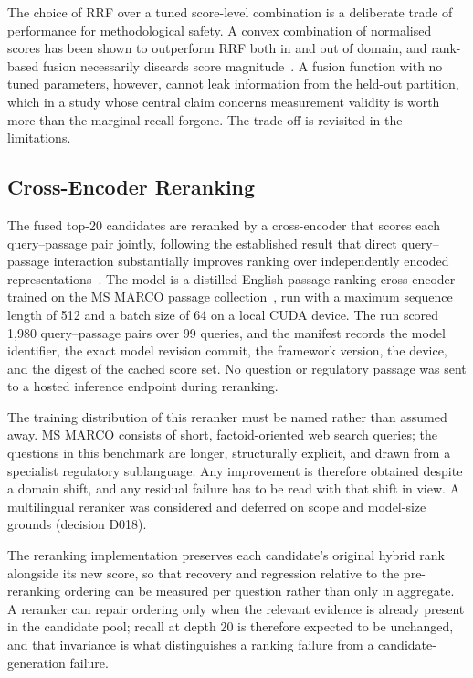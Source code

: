 The choice of \ac{RRF} over a tuned score-level combination is a deliberate trade of performance for methodological safety. A convex combination of normalised scores has been shown to outperform \ac{RRF} both in and out of domain, and rank-based fusion necessarily discards score magnitude~\cite{bruch2024fusion}. A fusion function with no tuned parameters, however, cannot leak information from the held-out partition, which in a study whose central claim concerns measurement validity is worth more than the marginal recall forgone. The trade-off is revisited in the limitations.

\subsection{Cross-Encoder Reranking}

The fused top-20 candidates are reranked by a cross-encoder that scores each query--passage pair jointly, following the established result that direct query--passage interaction substantially improves ranking over independently encoded representations~\cite{nogueira2019reranking}. The model is a distilled English passage-ranking cross-encoder~\cite{wang2020minilm} trained on the MS MARCO passage collection~\cite{nguyen2016msmarco}, run with a maximum sequence length of 512 and a batch size of 64 on a local CUDA device. The run scored 1{,}980 query--passage pairs over 99 queries, and the manifest records the model identifier, the exact model revision commit, the framework version, the device, and the digest of the cached score set. No question or regulatory passage was sent to a hosted inference endpoint during reranking.

The training distribution of this reranker must be named rather than assumed away. MS MARCO consists of short, factoid-oriented web search queries; the questions in this benchmark are longer, structurally explicit, and drawn from a specialist regulatory sublanguage. Any improvement is therefore obtained despite a domain shift, and any residual failure has to be read with that shift in view. A multilingual reranker was considered and deferred on scope and model-size grounds (decision D018).

The reranking implementation preserves each candidate's original hybrid rank alongside its new score, so that recovery and regression relative to the pre-reranking ordering can be measured per question rather than only in aggregate. A reranker can repair ordering only when the relevant evidence is already present in the candidate pool; recall at depth 20 is therefore expected to be unchanged, and that invariance is what distinguishes a ranking failure from a candidate-generation failure.

